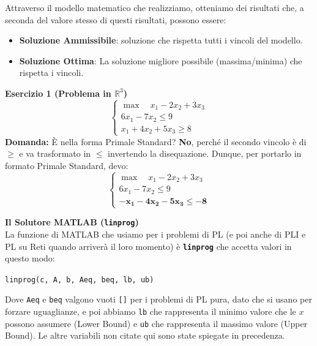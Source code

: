 \documentclass[12pt, a4paper]{article}
\newcommand{\separatore}{\noindent{\color{titlecolor!50}\rule{\textwidth}{0.6pt}}}
\begin{document}
	\vspace{0.4cm}
	Attraverso il modello matematico che realizziamo, otteniamo dei risultati che, a seconda del valore stesso di questi risultati, possono essere:
	\begin{itemize}[label=-, itemsep=2pt, leftmargin=2cm]
		\item \textbf{Soluzione Ammissibile}: soluzione che rispetta tutti i vincoli del modello.
		\item \textbf{Soluzione Ottima}: La soluzione migliore possibile (massima/minima) che rispetta i vincoli.
	\end{itemize}
	
	\vspace{0.6cm}
	\separatore
	\vspace{0.4cm}
	
	\textbf{Esercizio 1 (Problema in $\mathbb{R}^3$)}
	\[
	\begin{cases}
		\max \quad x_1 - 2x_2 + 3x_3 \\
		6x_1 - 7x_2 \leq 9 \\
		x_1 + 4x_2 + 5x_3 \geq 8
	\end{cases}
	\]
	\textbf{Domanda:} È nella forma Primale Standard? \textbf{No}, perché il secondo vincolo è di $\geq$ e va trasformato in $\leq$ invertendo la disequazione. Dunque, per portarlo in formato Primale Standard, devo:
	\[
	\begin{cases}
		\max \quad x_1 - 2x_2 + 3x_3 \\
		6x_1 - 7x_2 \leq 9 \\
		\mathbf{-x_1 - 4x_2 - 5x_3 \leq -8}
	\end{cases}
	\]
	
	\vspace{0.4cm}
	\textbf{Il Solutore MATLAB (\texttt{linprog})}\\
	La funzione di MATLAB che usiamo per i problemi di PL (e poi anche di PLI e PL su Reti quando arriverà il loro momento) è \textbf{\texttt{linprog}} che accetta valori in questo modo:
	\begin{center}
		\texttt{linprog(c, A, b, Aeq, beq, lb, ub)}
	\end{center}
	Dove \texttt{Aeq} e \texttt{beq} valgono vuoti \texttt{[]} per i problemi di PL pura, dato che si usano per forzare uguaglianze, e poi abbiamo \texttt{lb} che rappresenta il minimo valore che le $x$ possono assumere (Lower Bound) e \texttt{ub} che rappresenta il massimo valore (Upper Bound). Le altre variabili non citate qui sono state spiegate in precedenza.
	
\end{document}
